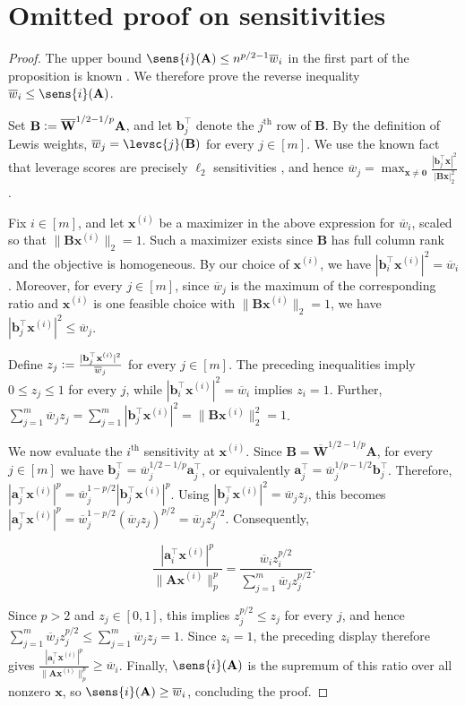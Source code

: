 \documentclass[11pt]{article}
\theoremstyle{plain}
\numberwithin{equation}{section}
\newcommand{\defeq}{\mathrel{\vcentcolon=}}
\newcommand{\bA}{\mathbf{A}}
\newcommand{\bB}{\mathbf{B}}
\newcommand{\bzero}{\mathbf{0}}
\newcommand{\ba}{\mathbf{a}}
\newcommand{\bb}{\mathbf{b}}
\newcommand{\bx}{\mathbf{x}}
\newcommand{\wbar}{\overline{w}}
\newcommand{\bWbar}{\overline{\mathbf{W}}}
\begin{document}
\section{Omitted proof on sensitivities}\label{sec:sens-proff}
\sensprop*
\begin{proof} The upper bound $\sens{i}(\bA)\leq n^{p/2-1}\wbar_i$ in the first part of the proposition is known \cite[Fact~3.3]{padmanabhan2023computing}. We therefore prove the reverse inequality $\wbar_i\leq\sens{i}(\bA)$.

Set $\bB\defeq\bWbar^{1/2-1/p}\bA$, and let $\bb_j^\top$ denote the $j^\mathrm{th}$ row of $\bB$. By the definition of Lewis weights, $\wbar_j=\levsc{j}(\bB)$ for every $j\in[m]$. We use the known fact that leverage scores are precisely $\ell_2$ sensitivities \cite[Section~2]{padmanabhan2023computing}, and hence
$\wbar_j=\max_{\bx\neq\bzero}\frac{|\bb_j^\top\bx|^2}{|\bB\bx|_2^2}$.

Fix $i\in[m]$, and let $\bx^{(i)}$ be a maximizer in the above expression for $\wbar_i$, scaled so that $\|\bB\bx^{(i)}\|_2=1$. Such a maximizer exists since $\bB$ has full column rank and the objective is homogeneous. By our choice of $\bx^{(i)}$, we have
$|\bb_i^\top\bx^{(i)}|^2=\wbar_i$.
Moreover, for every $j\in[m]$, since $\wbar_j$ is the maximum of the corresponding ratio and $\bx^{(i)}$ is one feasible choice with $\|\bB\bx^{(i)}\|_2=1$, we have
$|\bb_j^\top\bx^{(i)}|^2\leq\wbar_j$.

Define $z_j\defeq\frac{|\bb_j^\top\bx^{(i)}|^2}{\wbar_j}$ for every $j\in[m]$. The preceding inequalities imply $0\leq z_j\leq1$ for every $j$, while $|\bb_i^\top\bx^{(i)}|^2=\wbar_i$ implies $z_i=1$. Further,
$\sum_{j=1}^m\wbar_jz_j
=\sum_{j=1}^m|\bb_j^\top\bx^{(i)}|^2
=\|\bB\bx^{(i)}\|_2^2
=1$.

We now evaluate the $i^\mathrm{th}$ sensitivity at  $\bx^{(i)}$. Since $\bB=\bWbar^{1/2-1/p}\bA$, for every $j\in[m]$ we have $\bb_j^\top=\wbar_j^{1/2-1/p}\ba_j^\top$, or equivalently $\ba_j^\top=\wbar_j^{1/p-1/2}\bb_j^\top$. Therefore,
$|\ba_j^\top\bx^{(i)}|^p
=\wbar_j^{1-p/2}|\bb_j^\top\bx^{(i)}|^p$.
Using $|\bb_j^\top\bx^{(i)}|^2=\wbar_jz_j$, this becomes
$|\ba_j^\top\bx^{(i)}|^p
=\wbar_j^{1-p/2}(\wbar_jz_j)^{p/2}
=\wbar_jz_j^{p/2}$.
Consequently,

$$
\frac{|\ba_i^\top\bx^{(i)}|^p}{\|\bA\bx^{(i)}\|_p^p}
=
\frac{\wbar_i z_i^{p/2}}
{\sum_{j=1}^m\wbar_jz_j^{p/2}}.
$$

Since $p>2$ and $z_j\in[0,1]$, this implies $z_j^{p/2}\leq z_j$ for every $j$, and hence
$\sum_{j=1}^m\wbar_jz_j^{p/2}\leq\sum_{j=1}^m\wbar_jz_j=1$.
Since $z_i=1$, the preceding display therefore gives
$\frac{|\ba_i^\top\bx^{(i)}|^p}{\|\bA\bx^{(i)}\|_p^p}\geq\wbar_i$.
Finally, $\sens{i}(\bA)$ is the supremum of this ratio over all nonzero $\bx$, so
$\sens{i}(\bA)\geq\wbar_i$, concluding the proof. 
\end{proof}
\end{document}

